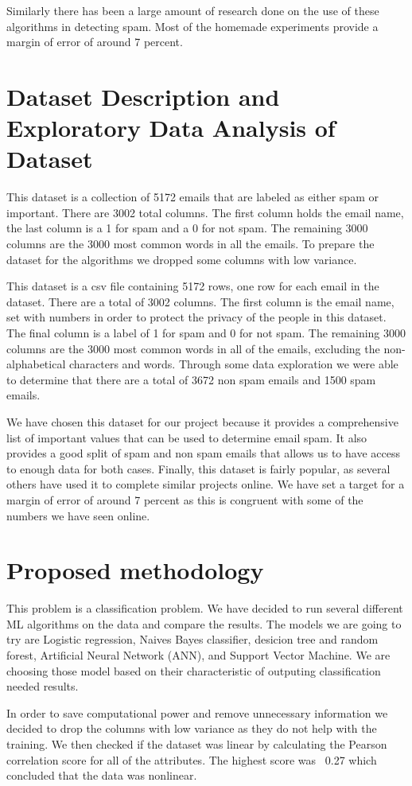 \documentclass[10pt]{article}
\begin{document}
Similarly there has been a large amount of research done on the use of these algorithms in detecting spam. Most of the homemade experiments provide a margin of error of around 7 percent. 

\section{Dataset Description and Exploratory Data Analysis of Dataset}

This dataset is a collection of 5172 emails that are labeled as either spam or important. There are 3002 total columns. The first column holds the email name, the last column is a 1 for spam and a 0 for not spam. The remaining 3000 columns are the 3000 most common words in all the emails.
To prepare the dataset for the algorithms we dropped some columns with low variance. 

This dataset is a csv file containing 5172 rows, one row for each email in the dataset. There are a total of 3002 columns. The first column is the email name, set with numbers in order to protect the privacy of the people in this dataset. The final column is a label of 1 for spam and 0 for not spam. The remaining 3000 columns are the 3000 most common words in all of the emails, excluding the non-alphabetical characters and words. Through some data exploration we were able to determine that there are a total of 3672 non spam emails and 1500 spam emails. 

We have chosen this dataset for our project because it provides a comprehensive list of important values that can be used to determine email spam. It also provides a good split of spam and non spam emails that allows us to have access to enough data for both cases. Finally, this dataset is fairly popular, as several others have used it to complete similar projects online. We have set a target for a margin of error of around 7 percent as this is congruent with some of the numbers we have seen online.  

\newpage
\section{Proposed methodology}

This problem is a classification problem. We have decided to run several different ML algorithms on the data and compare the results. The models we are going to try are Logistic regression, Naives Bayes classifier, desicion tree and random forest, Artificial Neural Network (ANN), and Support Vector Machine. We are choosing those model based on their characteristic of outputing classification needed results.

In order to save computational power and remove unnecessary information we decided to drop the columns with low variance as they do not help with the training. We then checked if the dataset was linear by calculating the Pearson correlation score for all of the attributes. The highest score was ~0.27 which concluded that the data was nonlinear.
\end{document}
